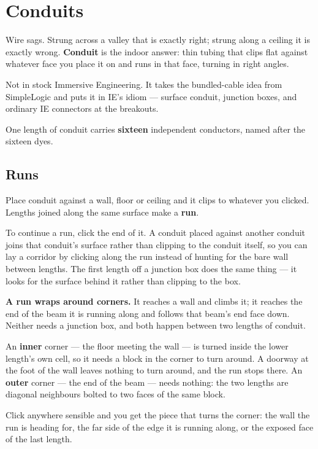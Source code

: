\chapter{Conduits}
\label{ch:conduits}

Wire sags. Strung across a valley that is exactly right; strung along a ceiling it is exactly wrong.
\textbf{Conduit} is the indoor answer: thin tubing that clips flat against whatever face you place
it on and runs in that face, turning in right angles.

\begin{iefork}
Not in stock Immersive Engineering. It takes the bundled-cable idea from SimpleLogic and puts it in
IE's idiom --- surface conduit, junction boxes, and ordinary IE connectors at the breakouts.
\end{iefork}

One length of conduit carries \textbf{sixteen} independent conductors, named after the sixteen dyes.

\section{Runs}

Place conduit against a wall, floor or ceiling and it clips to whatever you clicked. Lengths joined
along the same surface make a \textbf{run}.

To continue a run, click the end of it. A conduit placed against another conduit joins that
conduit's surface rather than clipping to the conduit itself, so you can lay a corridor by clicking
along the run instead of hunting for the bare wall between lengths. The first length off a junction
box does the same thing --- it looks for the surface behind it rather than clipping to the box.

\textbf{A run wraps around corners.} It reaches a wall and climbs it; it reaches the end of the beam
it is running along and follows that beam's end face down. Neither needs a junction box, and both
happen between two lengths of conduit.

An \textbf{inner} corner --- the floor meeting the wall --- is turned inside the lower length's own
cell, so it needs a block in the corner to turn around. A doorway at the foot of the wall leaves
nothing to turn around, and the run stops there. An \textbf{outer} corner --- the end of the beam ---
needs nothing: the two lengths are diagonal neighbours bolted to two faces of the same block.

Click anywhere sensible and you get the piece that turns the corner: the wall the run is heading
for, the far side of the edge it is running along, or the exposed face of the last length.

